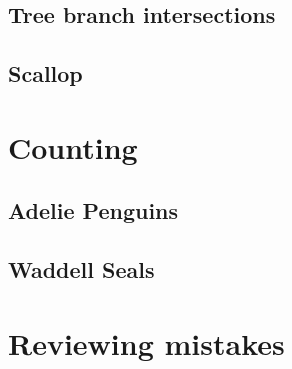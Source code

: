 \subsection{Tree branch intersections}
\subsection{Scallop}


\section{Counting}

\subsection{Adelie Penguins}
\subsection{Waddell Seals}




\section {Reviewing mistakes}